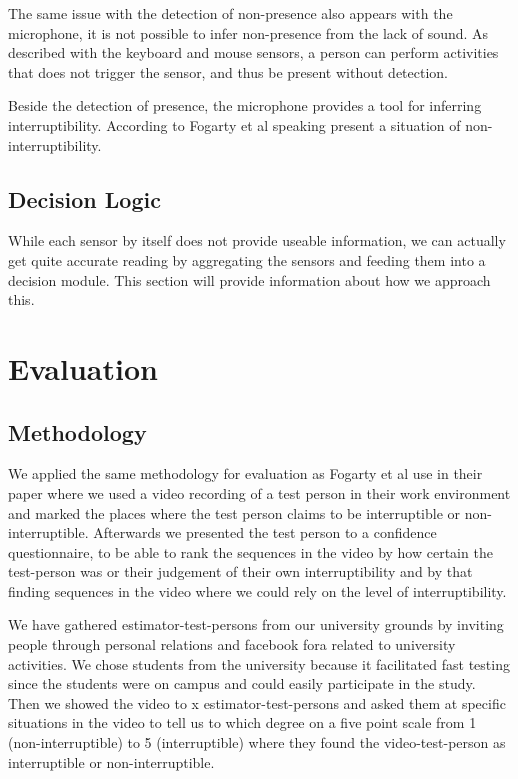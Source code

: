 \documentclass{sigchi}
\begin{document}
The same issue with the detection of non-presence also appears with the microphone, it is not possible to infer non-presence from the lack of sound.
As described with the keyboard and mouse sensors, a person can perform activities that does not trigger the sensor, and thus be present without detection.

Beside the detection of presence, the microphone provides a tool for inferring interruptibility.
According to Fogarty et al\cite{fogarty2005predicting} speaking present a situation of non-interruptibility.

\subsection{Decision Logic}
While each sensor by itself does not provide useable information, we can actually get quite accurate reading by aggregating the sensors and feeding them into a decision module.
This section will provide information about how we approach this.


\section{Evaluation}

\subsection{Methodology}
We applied the same methodology for evaluation as Fogarty et al use in their paper \cite{fogarty2005predicting} where we used a video recording of a test person in their work environment and marked the places where the test person claims to be interruptible or non-interruptible.
Afterwards we presented the test person to a confidence questionnaire, to be able to rank the sequences in the video by how certain the test-person was or their judgement of their own interruptibility and by that finding sequences in the video where we could rely on the level of interruptibility.

We have gathered estimator-test-persons from our university grounds by inviting people through personal relations and facebook fora related to university activities.
We chose students from the university because it facilitated fast testing since the students were on campus and could easily participate in the study.
Then we showed the video to x estimator-test-persons and asked them at specific situations in the video to tell us to which degree on a five point scale from 1 (non-interruptible) to 5 (interruptible) where they found the video-test-person as interruptible or non-interruptible.
\end{document}
